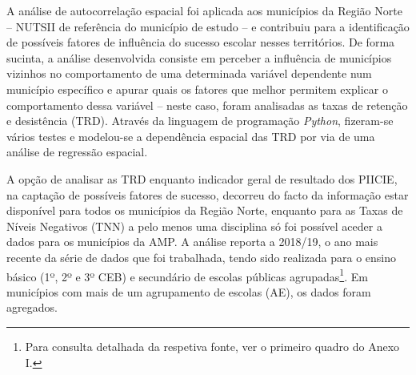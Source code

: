\documentclass[
]{book}
\begin{document}
A análise de autocorrelação espacial foi aplicada aos municípios da Região Norte -- NUTSII de referência do município de estudo -- e contribuiu para a identificação de possíveis fatores de influência do sucesso escolar nesses territórios. De forma sucinta, a análise desenvolvida consiste em perceber a influência de municípios vizinhos no comportamento de uma determinada variável dependente num município específico e apurar quais os fatores que melhor permitem explicar o comportamento dessa variável -- neste caso, foram analisadas as taxas de retenção e desistência (TRD). Através da linguagem de programação \emph{Python}, fizeram-se vários testes e modelou-se a dependência espacial das TRD por via de uma análise de regressão espacial.

A opção de analisar as TRD enquanto indicador geral de resultado dos PIICIE, na captação de possíveis fatores de sucesso, decorreu do facto da informação estar disponível para todos os municípios da Região Norte, enquanto para as Taxas de Níveis Negativos (TNN) a pelo menos uma disciplina só foi possível aceder a dados para os municípios da AMP. A análise reporta a 2018/19, o ano mais recente da série de dados que foi trabalhada, tendo sido realizada para o ensino básico (1º, 2º e 3º CEB) e secundário de escolas públicas agrupadas\footnote{Para consulta detalhada da respetiva fonte, ver o primeiro quadro do Anexo I.}. Em municípios com mais de um agrupamento de escolas (AE), os dados foram agregados.
\end{document}
